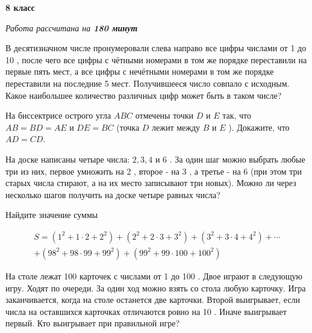 \centerline{\bf \huge 8 класс}
\centerline{\normalsize{\it Работа рассчитана на \bf{180} минут}}

В десятизначном числе пронумеровали слева направо все цифры числами от 1 до 10 , после чего все цифры с чётными номерами в том же порядке переставили на первые пять мест, а все цифры с нечётными номерами в том же порядке переставили на последние 5 мест. Получившееся число совпало с исходным. Какое наибольшее количество различных цифр может быть в таком числе?

На биссектрисе острого угла $A B C$ отмечены точки $D$ и $E$ так, что $A B=B D=A E$ и $D E=B C$ (точка $D$ лежит между $B$ и $E$ ). Докажите, что $A D=C D$.

На доске написаны четыре числа: $2,3,4$ и 6 . За один шаг можно выбрать любые три из них, первое умножить на 2 , второе - на 3 , а третье - на 6 (при этом три старых числа стирают, а на их место записывают три новых). Можно ли через несколько шагов получить на доске четыре равных числа?

Найдите значение суммы

$$
\begin{gathered}
S=\left(1^2+1 \cdot 2+2^2\right)+\left(2^2+2 \cdot 3+3^2\right)+\left(3^2+3 \cdot 4+4^2\right)+\cdots \\
+\left(98^2+98 \cdot 99+99^2\right)+\left(99^2+99 \cdot 100+100^2\right)
\end{gathered}
$$

На столе лежат 100 карточек с числами от 1 до 100 . Двое играют в следующую игру. Ходят по очереди. За один ход можно взять со стола любую карточку. Игра заканчивается, когда на столе останется две карточки. Второй выигрывает, если числа на оставшихся карточках отличаются ровно на 10 . Иначе выигрывает первый. Кто выигрывает при правильной игре?